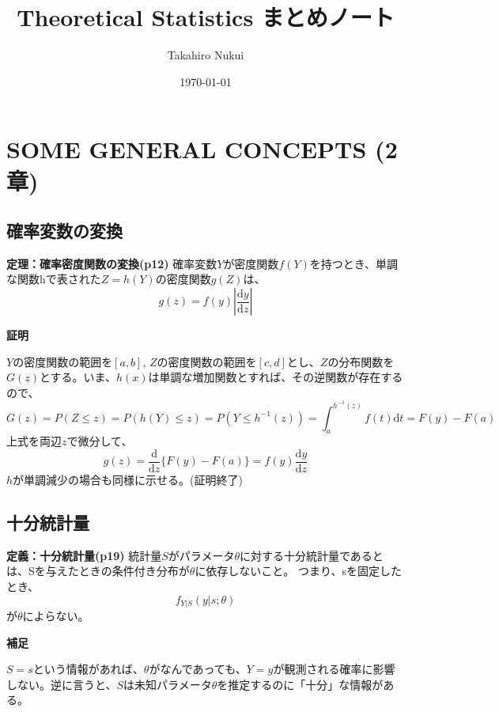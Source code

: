 \documentclass[10pt]{jarticle}
\title{Theoretical Statistics まとめノート}
\author{Takahiro Nukui}
\date{\today}
\begin{document}
\maketitle
\tableofcontents

\newpage
\section{SOME GENERAL CONCEPTS (2章)}
\subsection{確率変数の変換}
\begin{itembox}[l]{\textbf{定理：確率密度関数の変換(p12)}}
確率変数$Y$が密度関数$f(Y)$を持つとき、単調な関数hで表された$Z=h(Y)$の密度関数$g(Z)$は、
\[g(z)=f(y)|\frac{\mathrm dy}{\mathrm dz}|\]
\end{itembox}

\textbf{証明}

$Y$の密度関数の範囲を$[a,b]$, $Z$の密度関数の範囲を$[c,d]$とし、$Z$の分布関数を$G(z)$とする。いま、$h(x)$は単調な増加関数とすれば、その逆関数が存在するので、
\[G(z)=P(Z\leq z)=P(h(Y) \leq z)=P(Y \leq h^{-1}(z))=\int^{h^{-1}(z)}_{a}f(t){\mathrm dt}
=F(y)-F(a)\]
上式を両辺$z$で微分して、
\[g(z)=\frac{\mathrm d}{\mathrm dz}\{F(y)-F(a)\}=f(y)\frac{\mathrm dy}{\mathrm dz}\]
$h$が単調減少の場合も同様に示せる。(証明終了)


\subsection{十分統計量}
\begin{itembox}[l]{\textbf{定義：十分統計量(p19)}}
統計量$S$がパラメータ$\theta$に対する十分統計量であるとは、Sを与えたときの条件付き分布が$\theta$に依存しないこと。
つまり、sを固定したとき、
\[f_{Y|S}(y|s;\theta)\]
が$\theta$によらない。
\end{itembox}
\textbf{補足}

$S=s$という情報があれば、$\theta$がなんであっても、$Y=y$が観測される確率に影響しない。逆に言うと、$S$は未知パラメータ$\theta$を推定するのに「十分」な情報がある。
\end{document}
